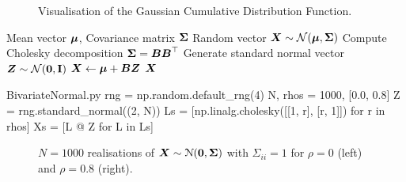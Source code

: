 \begin{figure}[H]
	\centering
	
	\caption{Visualisation of the Gaussian Cumulative Distribution Function.}\label{fig:GaussianCDF}
\end{figure}

\begin{algorithm}[H]
	\caption{Normal Random Vector Simulation}\label{alg:NormalVectorSim}
	\begin{algorithmic}[1]
		\Require{} Mean vector \(\boldsymbol{\mu}\), Covariance matrix \(\boldsymbol{\Sigma}\)
		\Ensure{} Random vector \(\boldsymbol{X} \sim \mathcal{N}(\boldsymbol{\mu}, \boldsymbol{\Sigma})\)
		\State{} Compute Cholesky decomposition \(\boldsymbol{\Sigma} = \boldsymbol{B}\boldsymbol{B}^\top\)
		\State{} Generate standard normal vector \(\boldsymbol{Z} \sim \mathcal{N}(\mathbf{0}, \mathbf{I})\)
		\State{} \(\boldsymbol{X} \gets \boldsymbol{\mu} + \boldsymbol{B}\boldsymbol{Z}\)
		\State{} \Return{} \(\boldsymbol{X}\)
	\end{algorithmic}
\end{algorithm}

\begin{Pcode}{BivariateNormal.py}
	rng = np.random.default_rng(4)
	N, rhos = 1000, [0.0, 0.8]
	Z = rng.standard_normal((2, N))
	Ls = [np.linalg.cholesky([[1, r], [r, 1]]) for r in rhos]
	Xs = [L @ Z for L in Ls]
\end{Pcode}

\begin{figure}[H]
	\centering
	
	\caption{\(N=1000\) realisations of \(\boldsymbol{X} \sim \EuScript{N}(\boldsymbol{0}, \boldsymbol{\Sigma})\) with \(\Sigma_{ii}=1\) for \(\rho=0\) (left) and \(\rho=0.8\) (right).}\label{fig:choleskyComparison}
\end{figure}
